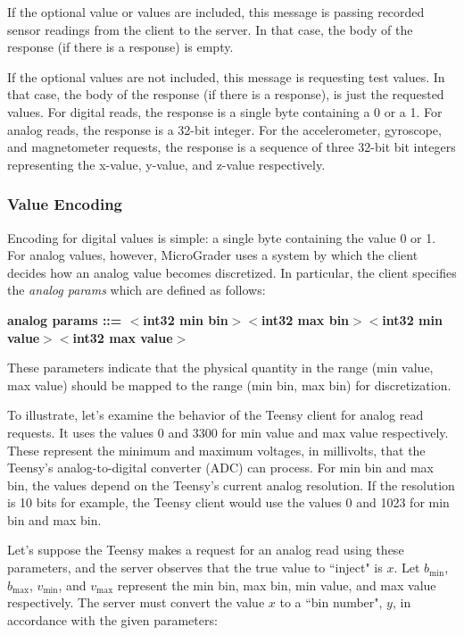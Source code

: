 \documentclass[12pt]{article}
\begin{document}
\vspace{5mm}

If the optional value or values are included, this message is passing recorded sensor readings from the client to the server.  In that case, the body of the response (if there is a response) is empty.  

If the optional values are not included, this message is requesting test values.  In that case, the body of the response (if there is a response), is just the requested values.  For digital reads, the response is a single byte containing a 0 or a 1.  For analog reads, the response is a 32-bit integer.  For the accelerometer, gyroscope, and magnetometer requests, the response is a sequence of three 32-bit bit integers representing the x-value, y-value, and z-value respectively.

\subsubsection{Value Encoding}
Encoding for digital values is simple: a single byte containing the value 0 or 1.  For analog values, however, MicroGrader uses a system by which the client decides how an analog value becomes discretized.  In particular, the client specifies the \textit{analog params} which are defined as follows:

\footnotesize
\textbf{analog params ::= $<$int32 min bin$>$$<$int32 max bin$>$$<$int32 min value$>$$<$int32 max value$>$}
\normalsize

\noindent These parameters indicate that the physical quantity in the range (min value, max value) should be mapped to the range (min bin, max bin) for discretization.

To illustrate, let's examine the behavior of the Teensy client for analog read requests.  It uses the values 0 and 3300 for min value and max value respectively.  These represent the minimum and maximum voltages, in millivolts, that the Teensy's analog-to-digital converter (ADC) can process.  For min bin and max bin, the values depend on the Teensy's current analog resolution.  If the resolution is 10 bits for example, the Teensy client would use the values 0 and 1023 for min bin and max bin.

Let's suppose the Teensy makes a request for an analog read using these parameters, and the server observes that the true value to ``inject" is $x$.  Let $b_{\text{min}}$, $b_{\text{max}}$, $v_{\text{min}}$, and $v_{\text{max}}$ represent the min bin, max bin, min value, and max value respectively.  The server must convert the value $x$ to a ``bin number", $y$, in accordance with the given parameters:
\end{document}
